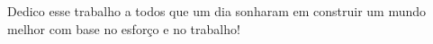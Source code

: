 Dedico esse trabalho a todos que um dia sonharam em construir um mundo melhor com base no esforço e no trabalho!